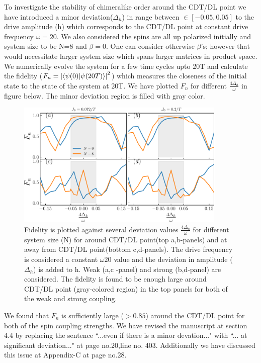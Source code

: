 \documentclass[10pt,
superscriptaddress,
amsmath,amssymb,showkeys,
aps, 
prb,
]{revtex4-2}
\begin{document}
\begin{enumerate}
\begin{enumerate}
\begin{enumerate}
{			To investigate the stability of chimeralike order around the CDT/DL point we have introduced a minor deviation($\Delta_h$) in range between $\in[-0.05, 0.05]$ to the drive amplitude (h) which corresponds to the CDT/DL point at constant drive frequency $\omega = 20$. We also considered the spins are all up polarized initially and system size to be N=8 and $\beta=0$. One can consider otherwise $\beta$'s; however that would necessitate larger system size which spans larger matrices in product space. We numerically evolve the system for a few time cycles upto 20T and calculate the fidelity ($F_n = \abs{\braket{\psi(0)}{\psi (20T)}}^2$) which measures the closeness of the initial state  to the state of the system at 20T. We have plotted $F_n$ for different $\frac{4\Delta_h}{\omega}$ in figure below. The minor deviation region is filled with gray color. 
			\begin{figure}[h!]
				\begin{center}
					\includegraphics[width=10cm]{./figs/figure14.pdf}
				\end{center}
				\caption{Fidelity is plotted against several deviation values $\frac{4\Delta_h}{\omega}$ for different system size (N) for around CDT/DL point(top a,b-panels) and at away from CDT/DL point(bottom c,d-panels). The drive frequency is considered a constant $\omega 20$ value and the deviation in amplitude ($\Delta_h$) is added to h. Weak (a,c -panel) and strong (b,d-panel) are considered. The fidelity is found to be enough large around CDT/DL point (gray-colored region) in the top panels for both of the weak and strong coupling.}
				\label{Fig:aroundCDT}
			\end{figure}
			We found that $F_n$ is sufficiently large ($>0.85$) around the CDT/DL point for both of the spin coupling strengths. We have revised the manuscript at section 4.4 by replacing the sentence ``...even if there is a minor devation..." with ``... at significant deviation..." at page no.20,line no. 403. Additionally we have discussed this issue at Appendix-C at page no.28. 
			}
		\end{enumerate}
	

\end{enumerate}
\end{enumerate}
\end{document}
